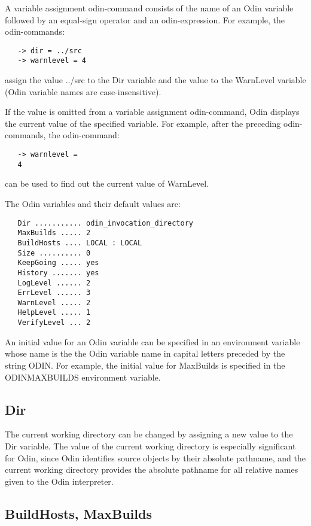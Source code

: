 A variable assignment odin-command consists of the name of an Odin variable
followed by an equal-sign operator and an odin-expression.
For example, the odin-commands:
\begin{verbatim}
   -> dir = ../src
   -> warnlevel = 4
\end{verbatim}
assign the value {\ex ../src} to the {\ex Dir} variable
and the value {} to the {\ex WarnLevel} variable
(Odin variable names are case-insensitive).

If the value is omitted from a variable assignment odin-command,
Odin displays the current value of the specified variable.
For example, after the preceding odin-commands, the odin-command:
\begin{verbatim}
   -> warnlevel =
   4
\end{verbatim}
can be used to find out the current value of {\ex WarnLevel}.

The Odin variables and their default values are:
\begin{verbatim}
   Dir ........... odin_invocation_directory
   MaxBuilds ..... 2
   BuildHosts .... LOCAL : LOCAL
   Size .......... 0
   KeepGoing ..... yes
   History ....... yes
   LogLevel ...... 2
   ErrLevel ...... 3
   WarnLevel ..... 2
   HelpLevel ..... 1
   VerifyLevel ... 2
\end{verbatim}

An initial value for an Odin variable can be
specified in an environment variable whose name is the
the Odin variable name in capital letters preceded by the
string {\ex ODIN}.  For example, the initial value for {\ex MaxBuilds}
is specified in the {\ex ODINMAXBUILDS} environment variable.

\subsection{Dir}

The current working directory can be changed by assigning a new value
to the {\ex Dir} variable.
The value of the current working directory is especially significant for Odin,
since Odin identifies source objects by their absolute pathname,
and the current working directory provides the absolute pathname
for all relative names given to the Odin interpreter.

\subsection{BuildHosts, MaxBuilds}

